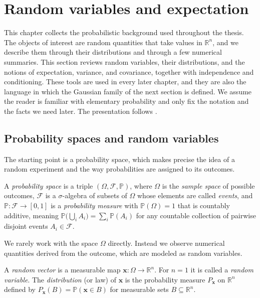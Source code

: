 \section{Random variables and expectation}
This chapter collects the probabilistic background used throughout the thesis. The objects of interest are random quantities that take values in $\mathbb{R}^n$, and we describe them through their distributions and through a few numerical summaries. This section reviews random variables, their distributions, and the notions of expectation, variance, and covariance, together with independence and conditioning. These tools are used in every later chapter, and they are also the language in which the Gaussian family of the next section is defined. We assume the reader is familiar with elementary probability and only fix the notation and the facts we need later. The presentation follows \cite[Ch.~2]{murphy:probabilistic_ml_introduction}.

\subsection{Probability spaces and random variables}
The starting point is a probability space, which makes precise the idea of a random experiment and the way probabilities are assigned to its outcomes.

\begin{definition}\label{def:prob_space}
A \emph{probability space} is a triple $(\Omega, \mathcal{F}, \mathbb{P})$, where $\Omega$ is the \emph{sample space} of possible outcomes, $\mathcal{F}$ is a $\sigma$-algebra of subsets of $\Omega$ whose elements are called \emph{events}, and $\mathbb{P}: \mathcal{F} \to [0,1]$ is a \emph{probability measure} with $\mathbb{P}(\Omega) = 1$ that is countably additive, meaning $\mathbb{P}\bigl(\bigcup_i A_i\bigr) = \sum_i \mathbb{P}(A_i)$ for any countable collection of pairwise disjoint events $A_i \in \mathcal{F}$.
\end{definition}

We rarely work with the space $\Omega$ directly. Instead we observe numerical quantities derived from the outcome, which are modeled as random variables.

\begin{definition}\label{def:random_variable}
A \emph{random vector} is a measurable map $\mathbf{x}: \Omega \to \mathbb{R}^n$. For $n = 1$ it is called a \emph{random variable}. The \emph{distribution} (or law) of $\mathbf{x}$ is the probability measure $P_{\mathbf{x}}$ on $\mathbb{R}^n$ defined by $P_{\mathbf{x}}(B) = \mathbb{P}(\mathbf{x} \in B)$ for measurable sets $B \subseteq \mathbb{R}^n$.
\end{definition}

